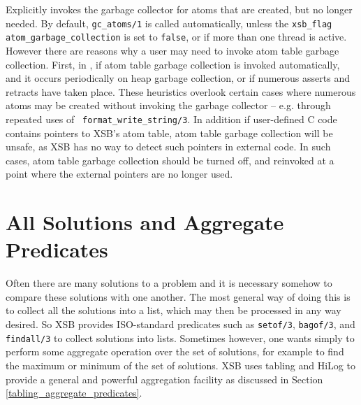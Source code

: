 \begin{description}
%
Explicitly invokes the garbage collector for atoms that are created,
but no longer needed.  By default, {\tt gc\_atoms/1} is called
automatically, unless the {\tt xsb\_flag} {\tt
  atom\_garbage\_collection} is set to {\tt false}, or if more than
one thread is active.  However there are reasons why a user may need
to invoke atom table garbage collection.  First, in \version{}, if
atom table garbage collection is invoked automatically, and it occurs
periodically on heap garbage collection, or if numerous asserts and
retracts have taken place.  These heuristics overlook certain cases
where numerous atoms may be created without invoking the garbage
collector -- e.g. through repeated uses of {\tt
  format\_write\_string/3}.  In addition if user-defined C code
contains pointers to XSB's atom table, atom table garbage collection
will be unsafe, as XSB has no way to detect such pointers in external
code.  In such cases, atom table garbage collection should be turned
off, and reinvoked at a point where the external pointers are no
longer used.

\end{description}


\section{All Solutions and Aggregate Predicates}
 
Often there are many solutions to a problem and it is necessary
somehow to compare these solutions with one another.  The most general
way of doing this is to collect all the solutions into a list, which
may then be processed in any way desired.  So XSB provides
ISO-standard predicates such as {\tt setof/3}, {\tt bagof/3}, and {\tt
findall/3} to collect solutions into lists.  Sometimes however, one
wants simply to perform some aggregate operation over the set of
solutions, for example to find the maximum or minimum of the set of
solutions.  XSB uses tabling and HiLog to provide a general and
powerful aggregation facility as discussed in Section
\ref{tabling_aggregate_predicates}.

